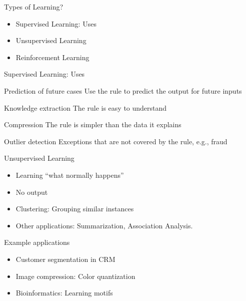 \documentclass{beamer}
\begin{document}
\begin{frame}{Types of Learning?}
\begin{itemize}
    \item Supervised Learning: Uses
    \item Unsupervised Learning
    \item Reinforcement Learning
\end{itemize}
\end{frame}

\begin{frame}{Supervised Learning: Uses}
   \begin{block}{Prediction of future cases}
   Use the rule to predict the output for future inputs
   \end{block}
   \begin{block}{Knowledge extraction}
 The rule is easy to understand
   \end{block}
   \begin{block}{Compression}
  The rule is simpler than the data it explains
   \end{block}
   \begin{block}{Outlier detection}
   Exceptions that are not covered by the rule, e.g., fraud
   \end{block}
  
\end{frame}

\begin{frame}{Unsupervised Learning}
    \begin{itemize}
        \item Learning “what normally happens”
\item No output
\item Clustering: Grouping similar instances
\item Other applications: Summarization, Association Analysis. \end{itemize}
\begin{block}{Example applications}
\begin{itemize}
    \item Customer segmentation in CRM
\item Image compression: Color quantization
\item Bioinformatics: Learning motifs
\end{itemize}
\end{block}
\end{frame}
\end{document}
